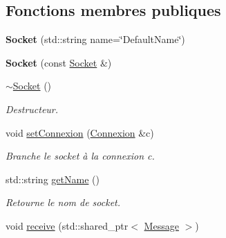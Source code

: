 \subsection*{Fonctions membres publiques}
\begin{DoxyCompactItemize}
\item 
\hypertarget{classSocket_a04302e4ac7ddb995c766de9078cd848c}{{\bfseries Socket} (std\-::string name=\char`\"{}Default\-Name\char`\"{})}\label{classSocket_a04302e4ac7ddb995c766de9078cd848c}

\item 
\hypertarget{classSocket_a0dd97f1387c3bd8008cb7de47583a985}{{\bfseries Socket} (const \hyperlink{classSocket}{Socket} \&)}\label{classSocket_a0dd97f1387c3bd8008cb7de47583a985}

\item 
\hypertarget{classSocket_aeac4eb6379a543d38ed88977d3b6630a}{\hyperlink{classSocket_aeac4eb6379a543d38ed88977d3b6630a}{$\sim$\-Socket} ()}\label{classSocket_aeac4eb6379a543d38ed88977d3b6630a}

\begin{DoxyCompactList}\small\item\em Destructeur. \end{DoxyCompactList}\item 
\hypertarget{classSocket_a96d104e32d5f376796fb411874954e7d}{void \hyperlink{classSocket_a96d104e32d5f376796fb411874954e7d}{set\-Connexion} (\hyperlink{classConnexion}{Connexion} \&c)}\label{classSocket_a96d104e32d5f376796fb411874954e7d}

\begin{DoxyCompactList}\small\item\em Branche le socket à la connexion c. \end{DoxyCompactList}\item 
\hypertarget{classSocket_aaefa10006cbf7a7a082e4adc606b3cea}{std\-::string \hyperlink{classSocket_aaefa10006cbf7a7a082e4adc606b3cea}{get\-Name} ()}\label{classSocket_aaefa10006cbf7a7a082e4adc606b3cea}

\begin{DoxyCompactList}\small\item\em Retourne le nom de socket. \end{DoxyCompactList}\item 
\hypertarget{classSocket_a9adf799b90c455f3a1f4151adb031fd0}{void \hyperlink{classSocket_a9adf799b90c455f3a1f4151adb031fd0}{receive} (std\-::shared\-\_\-ptr$<$ \hyperlink{classMessage}{Message} $>$)}\label{classSocket_a9adf799b90c455f3a1f4151adb031fd0}


\end{DoxyCompactItemize}
